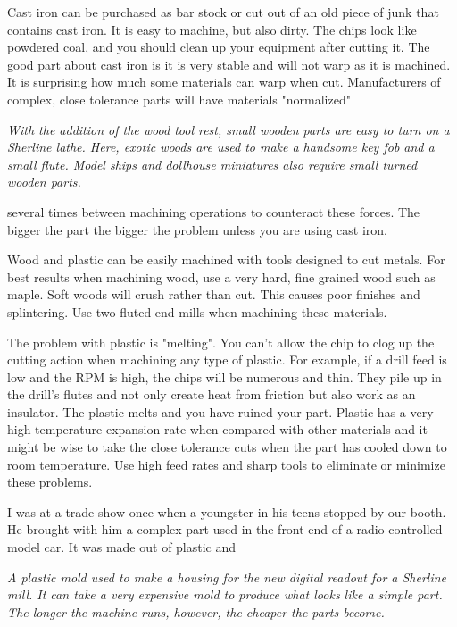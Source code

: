 
Cast iron can be purchased as bar stock or cut out of an old piece of junk that
contains cast iron. It is easy to machine, but also dirty. The chips look like
powdered coal, and you should clean up your equipment after cutting it. The good
part about cast iron is it is very stable and will not warp as it is machined.
It is surprising how much some materials can warp when cut. Manufacturers of
complex, close tolerance parts will have materials "normalized"

\bigskip
\textit{With the addition of the wood tool rest, small wooden parts are easy to
turn on a Sherline lathe. Here, exotic woods are used to make a handsome key fob
and a small flute. Model ships and dollhouse miniatures also require small
turned wooden parts.}
\bigskip

several times between machining operations to counteract these forces. The
bigger the part the bigger the problem unless you are using cast iron.


Wood and plastic can be easily machined with tools designed to cut metals. For
best results when machining wood, use a very hard, fine grained wood such as
maple. Soft woods will crush rather than cut. This causes poor finishes and
splintering. Use two-fluted end mills when machining these materials.

The problem with plastic is "melting". You can't allow the chip to clog up the
cutting action when machining any type of plastic. For example, if a drill feed
is low and the RPM is high, the chips will be numerous and thin. They pile up in
the drill's flutes and not only create heat from friction but also work as an
insulator. The plastic melts and you have ruined your part. Plastic has a very
high temperature expansion rate when compared with other materials and it might
be wise to take the close tolerance cuts when the part has cooled down to room
temperature. Use high feed rates and sharp tools to eliminate or minimize these
problems.


I was at a trade show once when a youngster in his teens stopped by our booth.
He brought with him a complex part used in the front end of a radio controlled
model car. It was made out of plastic and

\bigskip
\textit{A plastic mold used to make a housing for the new digital readout for a
Sherline mill. It can take a very expensive mold to produce what looks like a
simple part. The longer the machine runs, however, the cheaper the parts
become.}


